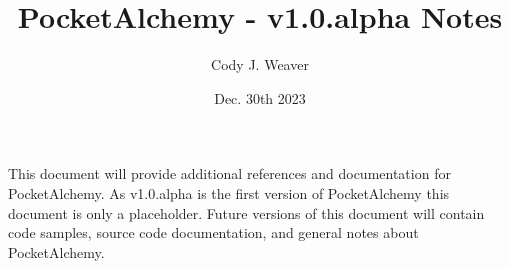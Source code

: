 \documentclass[12pt]{article}
\begin{document}
\title{PocketAlchemy - v1.0.alpha Notes}
\author{Cody J. Weaver}
\date{Dec. 30th 2023}
\maketitle

\begin{center}

\indent This document will provide additional references and 
documentation for PocketAlchemy. As v1.0.alpha is the first version
of PocketAlchemy this document is only a placeholder. Future versions
of this document will contain code samples, source code documentation,
and general notes about PocketAlchemy.

\end{center}
    
\end{document}
